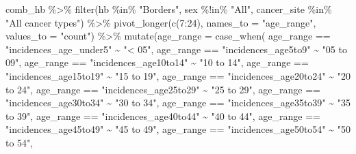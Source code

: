 \documentclass[
]{article}
\newenvironment{Shaded}{\begin{snugshade}}{\end{snugshade}}
\newcommand{\AttributeTok}[1]{\textcolor[rgb]{0.77,0.63,0.00}{#1}}
\newcommand{\DecValTok}[1]{\textcolor[rgb]{0.00,0.00,0.81}{#1}}
\newcommand{\FunctionTok}[1]{\textcolor[rgb]{0.00,0.00,0.00}{#1}}
\newcommand{\NormalTok}[1]{#1}
\newcommand{\SpecialCharTok}[1]{\textcolor[rgb]{0.00,0.00,0.00}{#1}}
\newcommand{\StringTok}[1]{\textcolor[rgb]{0.31,0.60,0.02}{#1}}
\begin{document}
\begin{Shaded}
\begin{Highlighting}[]
\NormalTok{comb\_hb }\SpecialCharTok{\%\textgreater{}\%} 
  \FunctionTok{filter}\NormalTok{(hb }\SpecialCharTok{\%in\%} \StringTok{"Borders"}\NormalTok{,}
\NormalTok{         sex }\SpecialCharTok{\%!in\%} \StringTok{"All"}\NormalTok{,}
\NormalTok{         cancer\_site }\SpecialCharTok{\%in\%} \StringTok{"All cancer types"}\NormalTok{) }\SpecialCharTok{\%\textgreater{}\%} 
  \FunctionTok{pivot\_longer}\NormalTok{(}\FunctionTok{c}\NormalTok{(}\DecValTok{7}\SpecialCharTok{:}\DecValTok{24}\NormalTok{),}
               \AttributeTok{names\_to =} \StringTok{"age\_range"}\NormalTok{,}
               \AttributeTok{values\_to =} \StringTok{"count"}\NormalTok{) }\SpecialCharTok{\%\textgreater{}\%}
  \FunctionTok{mutate}\NormalTok{(}\AttributeTok{age\_range =} \FunctionTok{case\_when}\NormalTok{(}
\NormalTok{    age\_range }\SpecialCharTok{==} \StringTok{"incidences\_age\_under5"} \SpecialCharTok{\textasciitilde{}} \StringTok{"\textless{} 05"}\NormalTok{,}
\NormalTok{    age\_range }\SpecialCharTok{==} \StringTok{"incidences\_age5to9"} \SpecialCharTok{\textasciitilde{}} \StringTok{"05 to 09"}\NormalTok{,}
\NormalTok{    age\_range }\SpecialCharTok{==} \StringTok{"incidences\_age10to14"} \SpecialCharTok{\textasciitilde{}} \StringTok{"10 to 14"}\NormalTok{,}
\NormalTok{    age\_range }\SpecialCharTok{==} \StringTok{"incidences\_age15to19"} \SpecialCharTok{\textasciitilde{}} \StringTok{"15 to 19"}\NormalTok{,}
\NormalTok{    age\_range }\SpecialCharTok{==} \StringTok{"incidences\_age20to24"} \SpecialCharTok{\textasciitilde{}} \StringTok{"20 to 24"}\NormalTok{,}
\NormalTok{    age\_range }\SpecialCharTok{==} \StringTok{"incidences\_age25to29"} \SpecialCharTok{\textasciitilde{}} \StringTok{"25 to 29"}\NormalTok{,}
\NormalTok{    age\_range }\SpecialCharTok{==} \StringTok{"incidences\_age30to34"} \SpecialCharTok{\textasciitilde{}} \StringTok{"30 to 34"}\NormalTok{,}
\NormalTok{    age\_range }\SpecialCharTok{==} \StringTok{"incidences\_age35to39"} \SpecialCharTok{\textasciitilde{}} \StringTok{"35 to 39"}\NormalTok{,}
\NormalTok{    age\_range }\SpecialCharTok{==} \StringTok{"incidences\_age40to44"} \SpecialCharTok{\textasciitilde{}} \StringTok{"40 to 44"}\NormalTok{,}
\NormalTok{    age\_range }\SpecialCharTok{==} \StringTok{"incidences\_age45to49"} \SpecialCharTok{\textasciitilde{}} \StringTok{"45 to 49"}\NormalTok{,}
\NormalTok{    age\_range }\SpecialCharTok{==} \StringTok{"incidences\_age50to54"} \SpecialCharTok{\textasciitilde{}} \StringTok{"50 to 54"}\NormalTok{,}

\end{Highlighting}
\end{Shaded}
\end{document}
